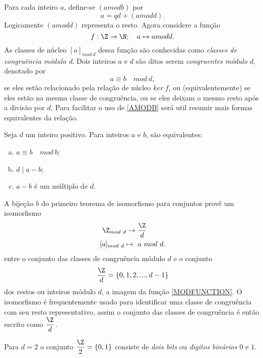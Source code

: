       Para cada inteiro $a$, define-se $(a mod b)$ por
      \begin{equation}\label{MOD}
         a = qd + (a mod d).
      \end{equation}
      Logicamente $(a mod d)$ representa o resto. Agora considere a função
      \begin{equation}\label{MODFUNCTION}
         f: \Z \to \N;\quad a \mapsto a mod d.
      \end{equation}
      As classes de núcleo $[a]_{mod\ d}$ dessa função são conhecidas como \emph{classes de congruência módulo d}. Dois inteiros $a$ e $d$ são ditos serem \emph{congruentes módulo} $d$, denotado por
      \begin{equation}\label{AMODB}
         a \equiv b\quad mod\ d,
      \end{equation}
      se eles estão relacionado pela relação de núcleo $ker\ f$, ou (equivalentemente) se eles estão na mesma classe de congruência, ou se eles deixam o mesmo resto após a divisão por $d$. Para facilitar o uso de \ref{AMODB} será util resumir mais formas equivalentes da relação.
      \begin{stat}
         Seja $d$ um inteiro positivo. Para inteiros $a$ e $b$, são equivalentes:
         \begin{enumerate}[(a)]
            \item $a\equiv b\quad mod\ b$;
            \item $d \mid a - b$;
            \item $a-b$ é um múltiplo de $d$.
         \end{enumerate}
      \end{stat}
      A bijeção $b$ do primeiro teorema de isomorfismo para conjuntos provê um isomorfismo
      \begin{alignat}{2}
         &\ \Z_{mod\ d} \to \dfrac{\Z}{d}\nonumber\\
         &[a]_{mod\ d} \mapsto\ a\ mod\ d.
         \nonumber
      \end{alignat}
      entre o conjunto das classes de congruência módulo $d$ e o conjunto $$\dfrac{\Z}{d} = \{0,1,2,... , d-1\}$$ dos restos ou inteiros módulo $d$, a imagem da função \ref{MODFUNCTION}. O isomorfismo é frequentemente usado para identificar uma classe de congruência com seu resto representativo, assim o conjunto das classes de congruência é então escrito como $\dfrac{\Z}{d}$.

      Para $d=2$ o conjunto $\dfrac{\Z}{2} = \{0,1\}$ consiste de \emph{dois bits} ou \emph{digitos binários} $0$ e $1$.

